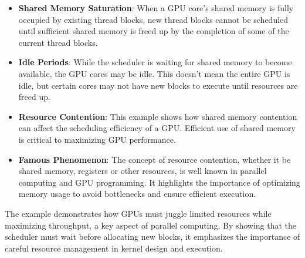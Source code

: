 \begin{itemize}
    \item \textbf{Shared Memory Saturation}: When a GPU core's shared memory is fully occupied by existing thread blocks, new thread blocks cannot be scheduled until sufficient shared memory is freed up by the completion of some of the current thread blocks.
    
    \item \textbf{Idle Periods}: While the scheduler is waiting for shared memory to become available, the GPU cores may be idle. This doesn't mean the entire GPU is idle, but certain cores may not have new blocks to execute until resources are freed up.

    \item \textbf{Resource Contention}: This example shows how shared memory contention can affect the scheduling efficiency of a GPU. Efficient use of shared memory is critical to maximizing GPU performance.

    \item \textbf{Famous Phenomenon}: The concept of resource contention, whether it be shared memory, registers or other resources, is well known in parallel computing and GPU programming. It highlights the importance of optimizing memory usage to avoid bottlenecks and ensure efficient execution.
\end{itemize}
The example demonstrates how GPUs must juggle limited resources while maximizing throughput, a key aspect of parallel computing. By showing that the scheduler must wait before allocating new blocks, it emphasizes the importance of careful resource management in kernel design and execution.
